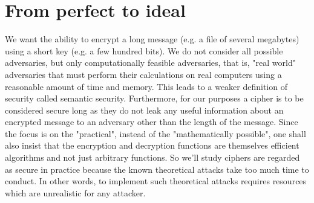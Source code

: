 \section{From perfect to ideal}
We want the ability to encrypt a long message (e.g. a file of several megabytes) using a short key (e.g. a few hundred bits). We do not consider all possible adversaries, but only computationally feasible adversaries, that is, "real world" adversaries that must perform their calculations on real computers using a reasonable amount of time and memory. This leads to a weaker definition of security called semantic security. Furthermore, for our purposes a cipher is to be considered secure long as they do not leak any useful information about an encrypted message to an adversary other than the length of the message. Since the focus is on the "practical", instead of the "mathematically possible", one shall also insist that the encryption and decryption functions are themselves efficient algorithms and not just arbitrary functions.
So we'll study ciphers are regarded as secure in practice because the known theoretical attacks take too much time to conduct. In other words, to implement such theoretical attacks requires resources which are unrealistic for any attacker.

